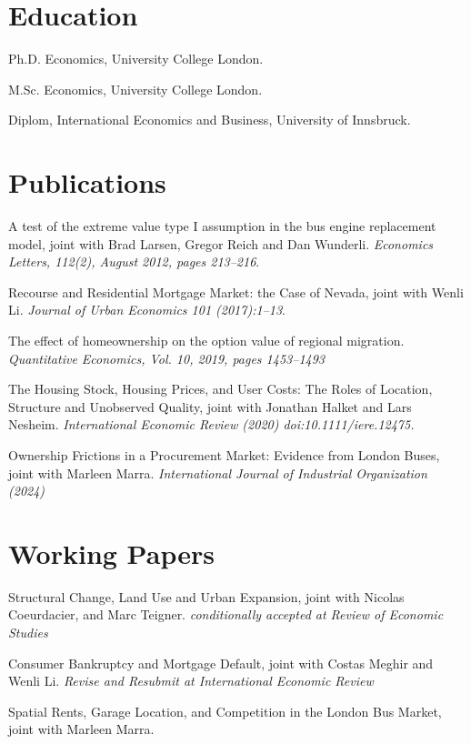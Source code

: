 \documentclass[letterpaper]{article}
\renewenvironment{itemize}{
  \begin{list}{}{
    \setlength{\leftmargin}{1.5em}
  }
}{
  \end{list}
}
\begin{document}
\section*{Education}

\begin{itemize}
  \setlength{\itemindent}{26pt}
  \item[2015:] Ph.D. Economics, University College London.
   
  \item[2008:] M.Sc. Economics, University College London.

  \item[2006:] Diplom, International Economics and Business, University of Innsbruck.

\end{itemize}


\section*{Publications}

\begin{itemize}
\item A test of the extreme value type I assumption in the bus engine replacement model, joint with Brad Larsen, Gregor Reich and Dan Wunderli. {\it Economics Letters, 112(2), August 2012, pages 213--216}.
\item Recourse and Residential Mortgage Market: the Case of Nevada, joint with Wenli Li. {\it Journal of Urban Economics 101 (2017):1–13}.
\item The effect of homeownership on the option value of regional migration. {\it Quantitative Economics, Vol. 10, 2019, pages 1453--1493}
\item The Housing Stock, Housing Prices, and User Costs: The Roles of Location, Structure and Unobserved Quality, joint with Jonathan Halket and Lars Nesheim. {\it International Economic Review (2020) doi:10.1111/iere.12475.}
\item Ownership Frictions in a Procurement Market: Evidence from London Buses, joint with Marleen Marra. {\it International Journal of Industrial Organization (2024)}
\end{itemize}


\section*{Working Papers}

\begin{itemize}

\item Structural Change, Land Use and Urban Expansion, joint with Nicolas Coeurdacier, and Marc Teigner. {\it conditionally accepted at Review of Economic Studies}
\item Consumer Bankruptcy and Mortgage Default, joint with Costas Meghir and Wenli Li. {\it Revise and Resubmit at International Economic Review}

\item Spatial Rents, Garage Location, and Competition in the London Bus Market, joint with Marleen Marra.
\end{itemize}
\end{document}
